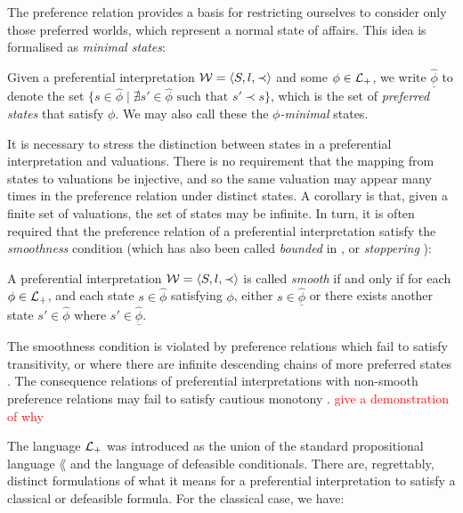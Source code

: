 The preference relation provides a basis for restricting ourselves to consider only those preferred worlds, which represent
a normal state of affairs. This idea is formalised as \textit{minimal states}:

\begin{definition}
	\label{definition:state-minimal}

	Given a preferential interpretation $\mathcal{W} = \langle S,l,\prec \rangle$ and some $\phi \in \mathcal{L}_+$, we write $\underline{\hat{\phi}}$ to denote the set
	$\{s \in \hat{\phi}\mid \nexists s' \in \hat{\phi}\text{ such that }s' \prec s \}$, which is the set of \textit{preferred
		states} that satisfy $\phi$. We may also call these the \textit{$\phi$-minimal} states.
\end{definition}

It is necessary to stress the distinction between states in a preferential interpretation and valuations. There is no requirement
that the mapping from states to valuations be injective, and so the same valuation may appear many times in the
preference relation under distinct states. A corollary is that, given a finite set of valuations, the set of states may be
infinite. In turn, it is often required that the preference relation of a preferential interpretation satisfy the \textit{smoothness}
condition (which has also been called \textit{bounded} in \cite{shohamSemanticApproach}, or \textit{stoppering}
\cite{makinson2003bridges}):

\begin{definition}
	\label{definition:smoothness} 

	A preferential interpretation $\mathcal{W} = \langle S,l,\prec \rangle$ is called \textit{smooth} if and only if for each $\phi \in \mathcal{L}_+$, and each
	state $s \in \hat{\phi}$ satisfying $\phi$, either $s \in \underline{\hat{\phi}}$ or there exists another state $s' \in
		\hat{\phi}$ where $s' \in \underline{\hat{\phi}}$.
\end{definition}

The smoothness condition is violated by preference relations which fail to satisfy transitivity, or where there are infinite
descending chains of more preferred states \cite{Schlechta1996}. The consequence relations of preferential
interpretations with non-smooth preference relations may fail to satisfy cautious monotony
\cite{kraus1990nonmonotonic,makinson2003bridges}. \textcolor{red}{give a demonstration of why}

The language $\mathcal{L}_+$ was introduced as the union of the standard propositional language $\lang$ and the language of defeasible
conditionals. There are, regrettably, distinct formulations of what it means for a preferential interpretation to
satisfy a classical or defeasible formula. For the classical case, we have:

